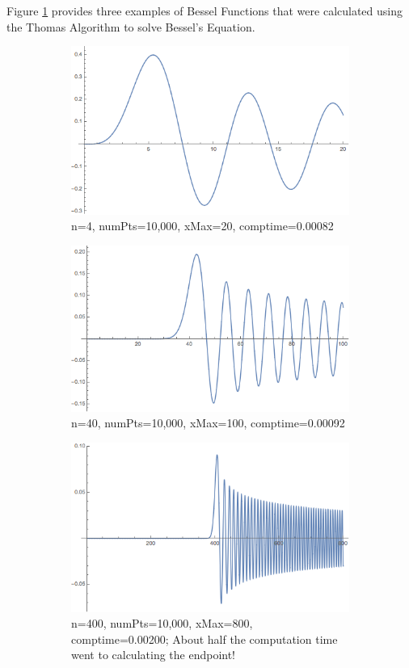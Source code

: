 \documentclass[onecolumn, groupedaddress, 10pt]{revtex4-1}
\begin{document}
Figure \ref{fig:selectBesselFunctions} provides three examples of Bessel Functions that were calculated using the Thomas Algorithm to solve Bessel's Equation.

\begin{figure}[H]
	\centering
	\begin{subfigure}{.5\textwidth}
  		\centering
  		\includegraphics[width=.9\linewidth]{BesselJ4.png}
  		\caption{n=4, numPts=10,000, xMax=20, comptime=0.00082}
	\end{subfigure}%
	\begin{subfigure}{.5\textwidth}
  		\centering
  		\includegraphics[width=0.9\linewidth]{BesselJ40.png}
  		\caption{n=40, numPts=10,000, xMax=100, comptime=0.00092}
	\end{subfigure}
	\begin{subfigure}{.5\textwidth}
  		\centering
  		\includegraphics[width=0.9\linewidth]{BesselJ400.png}
  		\caption{n=400, numPts=10,000, xMax=800, comptime=0.00200;  About half the computation time went to calculating the endpoint!}
	\end{subfigure}
	\caption{\label{fig:selectBesselFunctions}}
\end{figure}
\end{document}
